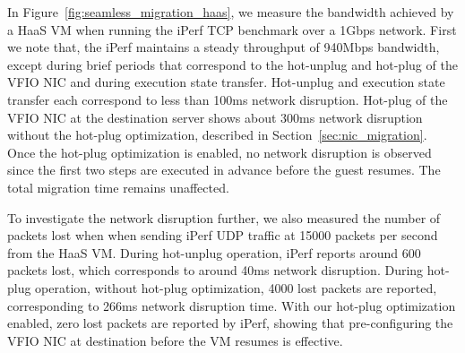 In Figure~\ref{fig:seamless_migration_haas}, we measure 
the bandwidth achieved by a HaaS VM 
when running the iPerf TCP benchmark over a 1Gbps network.
First we note that, the iPerf maintains 
a steady throughput of 940Mbps bandwidth,
except during brief periods that correspond to 
the hot-unplug and hot-plug of
the VFIO NIC and during execution state transfer.  
Hot-unplug and execution state transfer each correspond to
less than 100ms network disruption.
Hot-plug of the VFIO NIC at the destination server 
shows about 300ms network disruption without
the hot-plug optimization, described in Section~\ref{sec:nic_migration}.
Once the hot-plug optimization is enabled, no
network disruption is observed
since the first two steps are executed in advance 
before the guest resumes.
The total migration time remains unaffected.

To investigate the network disruption further, we also 
measured the number of packets lost when when sending
iPerf UDP traffic at 15000 packets per second from the HaaS VM.
During hot-unplug operation, 
iPerf reports around 600 packets lost, which corresponds to 
around 40ms network disruption. 
During hot-plug operation, without hot-plug optimization, 4000 lost
packets are reported, corresponding to 266ms network disruption time.
With our hot-plug optimization enabled, zero lost packets are reported 
by iPerf, showing that pre-configuring the VFIO NIC at destination
before the VM resumes is effective.

